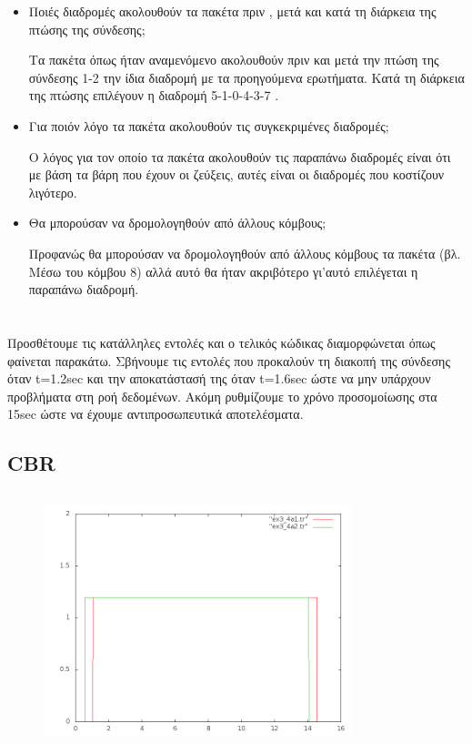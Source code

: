\documentclass[a4paper,9pt]{article}
\begin{document}
\begin{itemize}
    \item Ποιές διαδρομές ακολουθούν τα πακέτα πριν , μετά και κατά τη διάρκεια της
        πτώσης της σύνδεσης;

        Τα πακέτα όπως ήταν αναμενόμενο ακολουθούν πριν και μετά την πτώση της
        σύνδεσης 1-2 την ίδια διαδρομή με τα προηγούμενα ερωτήματα. Κατά τη διάρκεια
        της πτώσης επιλέγουν η διαδρομή 5-1-0-4-3-7 .

    \item Για ποιόν λόγο τα πακέτα ακολουθούν τις συγκεκριμένες διαδρομές;

        Ο λόγος για τον οποίο τα πακέτα ακολουθούν τις παραπάνω διαδρομές είναι ότι με
        βάση τα βάρη που έχουν οι ζεύξεις, αυτές είναι οι διαδρομές που κοστίζουν
        λιγότερο.

    \item Θα μπορούσαν να δρομολογηθούν από άλλους κόμβους;

        Προφανώς θα μπορούσαν να δρομολογηθούν από άλλους κόμβους τα πακέτα (βλ. Μέσω
        του κόμβου 8) αλλά αυτό θα ήταν ακριβότερο γι’αυτό επιλέγεται η παραπάνω
        διαδρομή.
\end{itemize}



\section{}


Προσθέτουμε τις κατάλληλες εντολές και ο τελικός κώδικας διαμορφώνεται όπως
φαίνεται παρακάτω. Σβήνουμε τις εντολές που προκαλούν τη διακοπή της σύνδεσης
όταν t=1.2sec  και την αποκατάστασή της όταν t=1.6sec ώστε να μην υπάρχουν
προβλήματα στη ροή δεδομένων. Ακόμη ρυθμίζουμε το χρόνο προσομοίωσης στα 15sec
ώστε να έχουμε αντιπροσωπευτικά αποτελέσματα.

\subsection{CBR}
\inputminted[fontsize=\footnotesize]{tcl}{files/ex3_4a1.tcl}

\begin{figure}[h]
    \centering
    \includegraphics[width=0.8\textwidth]{files/graph1.png}
\end{figure}
\end{document}
